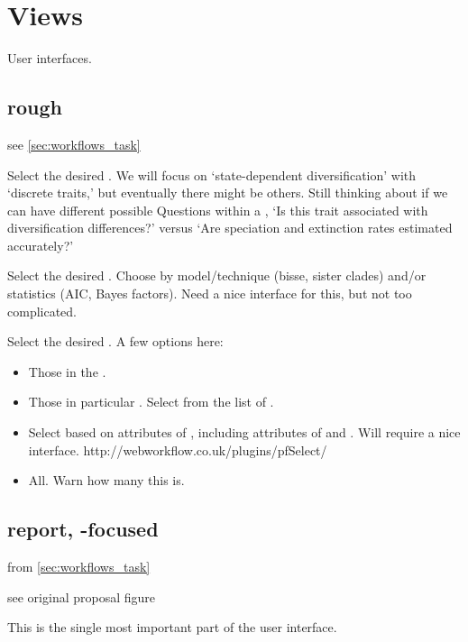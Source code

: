 \section{Views}

User interfaces.

\subsection{rough}

see \cref{sec:workflows_task}

\label{fig:views_select_task}
Select the desired \Task.
We will focus on `state-dependent diversification' with `discrete traits,' but eventually there might be others.
Still thinking about if we can have different possible Questions within a \Task, \eg `Is this trait associated with diversification differences?' versus `Are speciation and extinction rates estimated accurately?'

\label{fig:views_select_method}
Select the desired \Methods.
Choose by model/technique (\eg bisse, sister clades) and/or statistics (\eg AIC, Bayes factors).
Need a nice interface for this, but not too complicated.

\label{fig:views_select_element}
Select the desired \Elements.
A few options here:
\begin{itemize}
    \item Those in the \Benchmark.
    \item Those in particular \Refsets.  Select from the list of \Refsets.
    \item Select based on attributes of \Elements, including attributes of \Trees and \Traits.  Will require a nice interface. http://webworkflow.co.uk/plugins/pfSelect/
    \item All.  Warn how many this is.
\end{itemize}


\subsection{\Performance report, \Task-focused}
\label{sec:views_report_task}

from \cref{sec:workflows_task}

see original proposal figure

This is the single most important part of the user interface.

